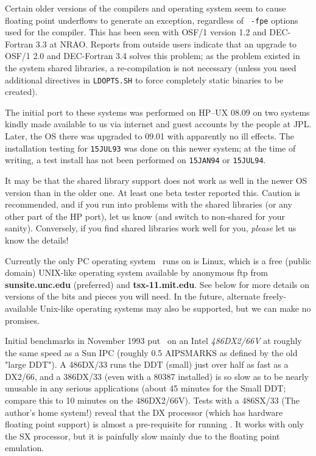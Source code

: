 {{Certain older versions of the compilers and operating system seem to cause
floating point underflows to generate an exception, regardless of {\tt
-fpe} options used for the compiler.  This has been seen with OSF/1
version 1.2 and DEC-Fortran 3.3 at NRAO.  Reports from outside users
indicate that an upgrade to OSF/1 2.0 and DEC-Fortran 3.4 solves this
problem; as the problem existed in the system shared libraries, a
re-compilation is not necessary (unless you used additional directives in
{\tt LDOPTS.SH} to force completely static binaries to be created).
\medskip


The initial port to these systems was performed on HP--UX 08.09 on
two systems kindly made available to us via internet and guest accounts
by the people at JPL.  Later, the OS there was upgraded to 09.01 with
apparently no ill effects.  The installation testing for {\tt 15JUL93} was
done on this newer system; at the time of writing, a test install has not
been performed on {\tt 15JAN94} or {\tt 15JUL94}.

It may be that the shared library support does not work as well in the
newer OS version than in the older one.  At least one beta tester reported
this.  Caution is recommended, and if you run into problems with the
shared libraries (or any other part of the HP port), let us know (and
switch to non-shared for your sanity).  Conversely, if you find shared
libraries work well for you, {\it please\/} let us know the details!
\medskip


Currently the only PC operating system \AIPS\ runs on is Linux, which is a
free (public domain) UNIX-like operating system available by anonymous ftp
from {\bf sunsite.unc.edu} (preferred) and {\bf tsx-11.mit.edu}.  See
below for more details on versions of the bits and pieces you will need.
In the future, alternate freely-available Unix-like operating systems may
also be supported, but we can make no promises.

Initial benchmarks in November 1993 put \AIPS\ on an Intel {\it
486DX2/66V\/} at roughly the same speed as a Sun IPC (roughly 0.5 AIPSMARKS
as defined by the old "large DDT").  A 486DX/33 runs the DDT (small) just
over half as fast as a DX2/66, and a 386DX/33 (even with a 80387
installed) is so slow as to be nearly unusable in any serious applications
(about 45 minutes for the Small DDT; compare this to 10 minutes on the
486DX2/66V).  Tests with a 486SX/33 (The author's home system!) reveal
that the DX processor (which has hardware floating point support) is
almost a pre-requisite for running \AIPS.  It works with only the SX
processor, but it is painfully slow mainly due to the floating point
emulation.

}}
